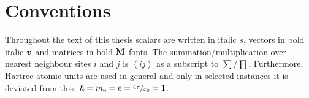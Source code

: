 \documentclass[ 10pt,
                DIV=10,
                headtopline=0.08em,
                headsepline=0.04em,
                headinclude,
                BCOR=6mm
              ]{scrbook}
\begin{document}
    
	\frontmatter



    
    {\hypersetup{hidelinks}\tableofcontents}%

    \clearpage
    \printglossaries

    

    \section*{Conventions}
    Throughout the text of this thesis scalars are written in italic $s$, vectors in bold italic $\vb*{v}$ and matrices in bold $\textbf M$ fonts. The summation/multiplication over nearest neighbour sites $i$ and $j$ is $\left\langle ij \right\rangle$ as a subscript to $\sum$/$\prod$. Furthermore, Hartree atomic units are used in general and only in selected instances it is deviated from this: $\hbar = m_\mathrm{e} = \mathrm e = \nicefrac{4\pi}{\varepsilon_0} = 1$. 
    \nonfrenchspacing

    \mainmatter
    \renewcommand{\thechapter}{\Roman{chapter}}
    

    

    

    

    

    

    \cleardoublepage
    \printbibliography
\end{document}
